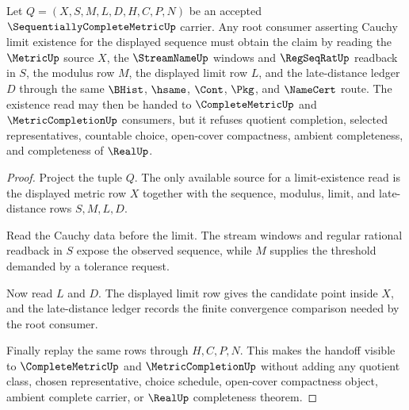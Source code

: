 \begin{theorem}
\label{thm:sequentially-complete-metric-root-cauchy-limit-existence}
Let $Q=(X,S,M,L,D,H,C,P,N)$ be an accepted $\SequentiallyCompleteMetricUp$ carrier. Any root consumer asserting Cauchy limit existence for the displayed sequence must obtain the claim by reading the $\MetricUp$ source $X$, the $\StreamNameUp$ windows and $\RegSeqRatUp$ readback in $S$, the modulus row $M$, the displayed limit row $L$, and the late-distance ledger $D$ through the same $\BHist$, $\hsame$, $\Cont$, $\Pkg$, and $\NameCert$ route. The existence read may then be handed to $\CompleteMetricUp$ and $\MetricCompletionUp$ consumers, but it refuses quotient completion, selected representatives, countable choice, open-cover compactness, ambient completeness, and completeness of $\RealUp$.
\end{theorem}
\begin{proof}
Project the tuple $Q$. The only available source for a limit-existence read is the displayed metric row $X$ together with the sequence, modulus, limit, and late-distance rows $S,M,L,D$.

Read the Cauchy data before the limit. The stream windows and regular rational readback in $S$ expose the observed sequence, while $M$ supplies the threshold demanded by a tolerance request.

Now read $L$ and $D$. The displayed limit row gives the candidate point inside $X$, and the late-distance ledger records the finite convergence comparison needed by the root consumer.

Finally replay the same rows through $H,C,P,N$. This makes the handoff visible to $\CompleteMetricUp$ and $\MetricCompletionUp$ without adding any quotient class, chosen representative, choice schedule, open-cover compactness object, ambient complete carrier, or $\RealUp$ completeness theorem.
\end{proof}

